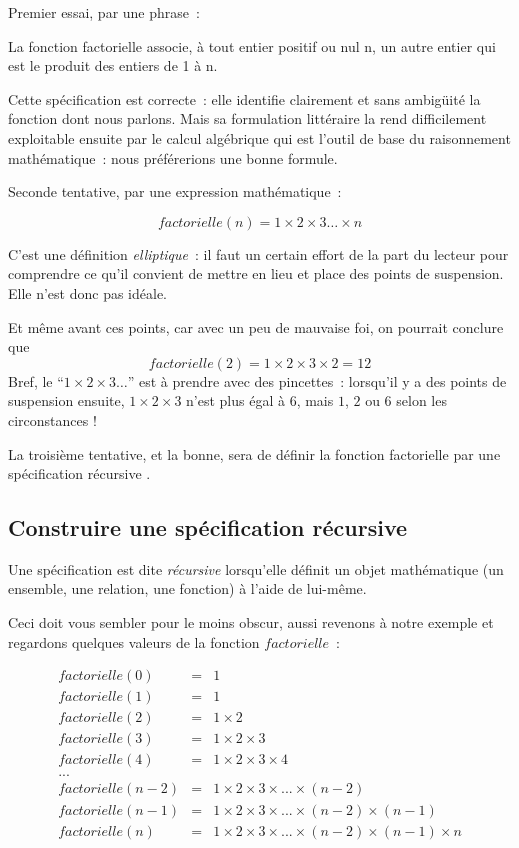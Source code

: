 Premier essai, par une phrase~:
\begin{citation}
	La fonction factorielle associe, à tout entier positif ou nul n, un autre entier qui est le produit des entiers de 1 à n.
\end{citation}

Cette spécification est correcte~: elle identifie clairement et sans
ambig\"{u}ité la fonction dont nous parlons. Mais sa formulation
littéraire la rend difficilement exploitable ensuite par le calcul
algébrique qui est l'outil de base du raisonnement mathématique~: nous
préférerions une bonne formule.

Seconde tentative, par une expression mathématique~:

\[factorielle (n) = 1 \times 2 \times 3 \ldots \times n\]

C'est une définition \emph{elliptique}~: il faut un certain effort de
la part du lecteur pour comprendre ce qu'il convient de mettre en lieu
et place des points de suspension. Elle n'est donc pas idéale.

Et m\^eme avant ces points, car avec un peu de mauvaise foi, on
pourrait conclure que 
$$factorielle (2) = 1\times 2 \times 3 \times 2 =
12$$
Bref, le ``$1 \times 2 \times 3 \ldots$'' est à prendre avec des
pincettes~: lorsqu'il y a des points de suspension ensuite, $1 \times
2 \times 3$ n'est plus égal à $6$, mais $1$, $2$ ou $6$ selon
les circonstances !

La troisième tentative, et la bonne, sera de définir la fonction
factorielle par une spécification récursive .


\subsection*{Construire une spécification récursive}

Une spécification est dite \emph{récursive} lorsqu'elle définit un
objet mathématique (un ensemble, une relation, une fonction) à l'aide
de lui-m\^eme. 

Ceci doit vous sembler pour le moins obscur, aussi
revenons à notre exemple et regardons quelques valeurs de la fonction
$factorielle$~:

$$\begin{array}{rcl}
	factorielle (0) 	&=& 1 \\
	factorielle (1) 	&=& 1 \\
	factorielle (2) 	&=& 1 \times 2 \\
	factorielle (3) 	&=& 1 \times 2 \times 3 \\
	factorielle (4) 	&=& 1 \times 2 \times 3 \times 4 \\
	... && \\
	factorielle (n - 2) &=& 1 \times 2 \times 3 \times ... \times (n-2)  \\
	factorielle (n - 1) &=& 1 \times 2 \times 3 \times ... \times (n-2) \times (n-1) \\
	factorielle (n ) 	&=& 1 \times 2 \times 3 \times ... \times (n-2) \times (n-1) \times n \\
\end{array}$$

